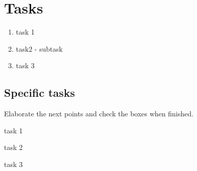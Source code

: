 \section{Tasks}
\begin{enumerate}
	\item task 1
	\item task2
	\subitem - subtask
	\item task 3
\end{enumerate}


\subsection{Specific tasks}
Elaborate the next points and check the boxes when finished.
\begin{todolist}
	\item task 1
	\item task 2
	\item task 3
\end{todolist}



